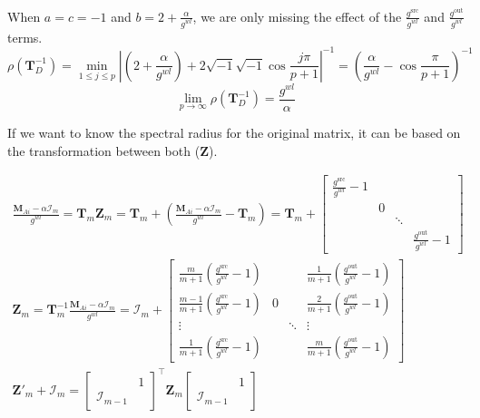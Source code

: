 \documentclass[journal,onecolumn]{IEEEtran}
\begin{document}
    When $a = c = -1$ and $b = 2 + \frac{\alpha}{g^{wl}}$, we are only missing the effect of the $\frac{g^\text{src}}{g^{wl}}$ and $\frac{g^\text{out}}{g^{wl}}$ terms.
    $$\rho(\mathbf{T}^{-1}_{D}) = \underset{1 \le j \le p}{\min}\left| \left( 2 + \frac{\alpha}{g^{wl}} \right) + 2\sqrt{-1}\sqrt{-1}\cos{\frac{j\pi}{p + 1}} \right|^{-1} = \left( \frac{\alpha}{g^{wl}} - \cos{\frac{\pi}{p + 1}} \right)^{-1}$$
    $$\underset{p \rightarrow \infty}{\lim} \rho(\mathbf{T}^{-1}_{D}) = \frac{g^{wl}}{\alpha}$$

    If we want to know the spectral radius for the original matrix, it can be based on the transformation between both ($\mathbf{Z}$).

    \begin{gather*}
        \frac{\mathbf{M}^{}_{Ai} - \alpha\mathcal{I}^{}_{m}}{g^{wl}} = \mathbf{T}^{}_{m}\mathbf{Z}^{}_{m} = \mathbf{T}^{}_{m} + \left( \frac{\mathbf{M}^{}_{Ai} - \alpha\mathcal{I}^{}_{m}}{g^{wl}} - \mathbf{T}^{}_{m} \right) = \mathbf{T}^{}_{m} + \begin{bmatrix} 
            \frac{g^\text{src}}{g^{wl}} - 1 \\ & 0 \\ & & \ddots{} \\ & & & \frac{g^\text{out}}{g^{wl}} - 1
        \end{bmatrix} \\
        \mathbf{Z}^{}_{m} = \mathbf{T}^{-1}_{m}\frac{\mathbf{M}^{}_{Ai} - \alpha\mathcal{I}^{}_{m}}{g^{wl}} = \mathcal{I}^{}_{m} + \left[ \begin{array}{rccr} 
            \frac{m}{m + 1}\left( \frac{g^\text{src}}{g^{wl}} - 1 \right) & & & \frac{1}{m + 1}\left( \frac{g^\text{out}}{g^{wl}} - 1 \right) \\
            \frac{m - 1}{m + 1}\left( \frac{g^\text{src}}{g^{wl}} - 1 \right) & 0 & & \frac{2}{m + 1}\left( \frac{g^\text{out}}{g^{wl}} - 1 \right) \\
            \vdots \qquad & & \ddots & \vdots \qquad \\
            \frac{1}{m + 1}\left( \frac{g^\text{src}}{g^{wl}} - 1 \right) & & & \frac{m}{m + 1}\left( \frac{g^\text{out}}{g^{wl}} - 1 \right)
        \end{array} \right] \\
        \mathbf{Z'}^{}_{m} + \mathcal{I}^{}_{m} = \begin{bmatrix}  & 1 \\ \mathcal{I}^{}_{m - 1} & \end{bmatrix}^\top \mathbf{Z}^{}_{m} \begin{bmatrix}  & 1 \\ \mathcal{I}^{}_{m - 1} & \end{bmatrix} \\

\end{gather*}
\end{document}
